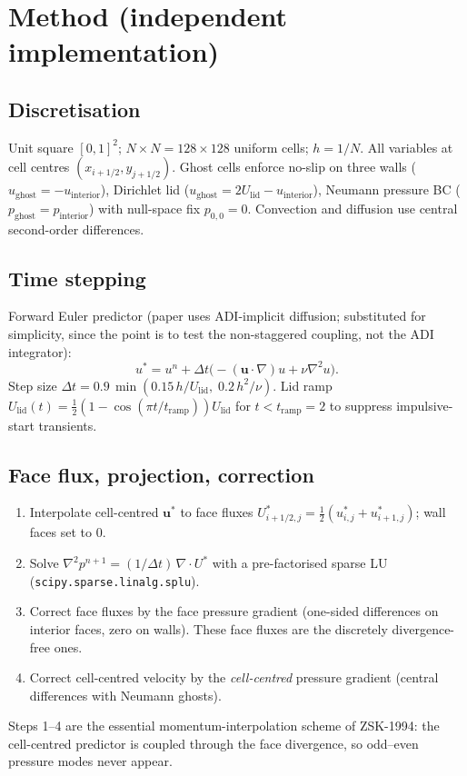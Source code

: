 \documentclass[11pt]{article}
\begin{document}
\section{Method (independent implementation)}
\subsection{Discretisation}
Unit square $[0,1]^2$; $N\times N=128\times 128$ uniform cells; $h=1/N$.
All variables at cell centres $(x_{i+1/2},y_{j+1/2})$. Ghost cells enforce
no-slip on three walls ($u_{\mathrm{ghost}}=-u_{\mathrm{interior}}$), Dirichlet
lid ($u_{\mathrm{ghost}}=2U_{\mathrm{lid}}-u_{\mathrm{interior}}$), Neumann
pressure BC ($p_{\mathrm{ghost}}=p_{\mathrm{interior}}$) with null-space fix
$p_{0,0}=0$. Convection and diffusion use central second-order differences.

\subsection{Time stepping}
Forward Euler predictor (paper uses ADI-implicit diffusion; substituted for
simplicity, since the point is to test the non-staggered coupling, not the
ADI integrator):
$$ u^\ast = u^n + \Delta t\bigl(-(\mathbf u\cdot\nabla)u + \nu\nabla^2 u\bigr). $$
Step size $\Delta t = 0.9\,\min(0.15\,h/U_{\mathrm{lid}},\;0.2\,h^2/\nu)$.
Lid ramp $U_{\mathrm{lid}}(t)=\tfrac12(1-\cos(\pi t/t_{\mathrm{ramp}}))U_{\mathrm{lid}}$
for $t<t_{\mathrm{ramp}}=2$ to suppress impulsive-start transients.

\subsection{Face flux, projection, correction}
\begin{enumerate}
\item Interpolate cell-centred $\mathbf u^\ast$ to face fluxes
      $U^\ast_{i+1/2,j}=\tfrac12(u^\ast_{i,j}+u^\ast_{i+1,j})$; wall faces set to 0.
\item Solve $\nabla^2 p^{n+1} = (1/\Delta t)\,\nabla\!\cdot U^\ast$ with a
      pre-factorised sparse LU (\texttt{scipy.sparse.linalg.splu}).
\item Correct face fluxes by the face pressure gradient (one-sided
      differences on interior faces, zero on walls). These face fluxes are
      the discretely divergence-free ones.
\item Correct cell-centred velocity by the \emph{cell-centred} pressure
      gradient (central differences with Neumann ghosts).
\end{enumerate}
Steps 1--4 are the essential momentum-interpolation scheme of ZSK-1994: the
cell-centred predictor is coupled through the face divergence, so odd--even
pressure modes never appear.
\end{document}
